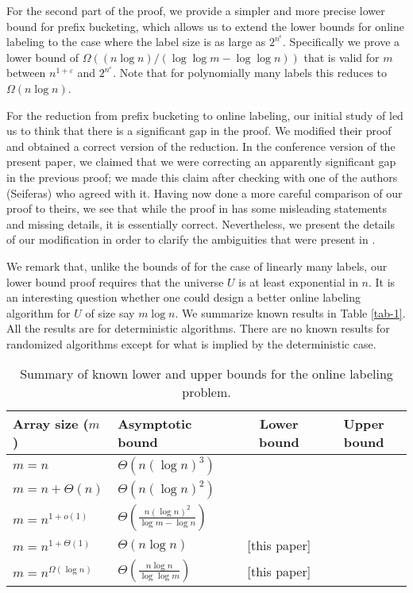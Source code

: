 \documentclass[11pt]{article}
\newcommand{\PTheta}[1]{\Theta\!\left(#1\right)}
\begin{document}
For the second part of the proof,
we provide a simpler and more precise lower bound for prefix bucketing,
which allows us to extend the lower bounds for online labeling to the case where the label size is as large as $2^{n^\epsilon}$.
Specifically we prove a lower bound of
$\Omega((n \log n) / (\log \log m - \log \log n))$ that is valid
for $m$ between $n^{1+\varepsilon}$ and $2^{n^{\varepsilon}}$.
Note that for polynomially many labels this reduces to $\Omega(n \log n)$.

For the reduction from prefix bucketing to online labeling,
our initial study of \cite{DSZ04} led us to think that there is a significant gap in the proof.
We modified their proof and obtained a correct version of the reduction.
In the conference version of the present paper,
we claimed that we were correcting an apparently significant gap in the previous proof;
we made this claim after checking with one of the authors (Seiferas) who agreed with it.
Having now done a more careful comparison of our proof to theirs,
we see that while the proof in \cite{DSZ04} has some misleading statements and missing details,
it is essentially correct.
Nevertheless, we present the details of our modification in order to clarify the ambiguities that were present in \cite{DSZ04}.


We remark that, unlike the bounds of \cite{BKS} for the case of linearly many labels, our lower bound proof requires that the universe
$U$ is at least exponential in $n$. It is an interesting question whether one could design
a better online labeling algorithm for $U$ of size say $m \log n$. We summarize known results in Table \ref{tab-1}. All the results
are for deterministic algorithms. There are no known results for randomized algorithms except for what is implied by the deterministic case.

\begin{table}
\centering
\caption{Summary of known lower and upper bounds for the online labeling problem.} \label{tab-1}
\begin{tabular}{l l c c}
	\toprule
	Array size ($m$) &
	Asymptotic bound &
	Lower bound &
	Upper bound
	\\ \toprule

	$m = n$ &
	$\PTheta{n (\log n)^3}$ &
	\cite{BKS} &
	\cite{Zhang}
	\\ \midrule

	$m = n + \PTheta{n}$ &
	$\PTheta{n (\log n)^2}$ &
	\cite{BKS} &
	\cite{Itaietal}
	\\ \midrule
	
	$m = n ^ {1 + o(1)}$ &
	$\PTheta{\frac{n (\log n)^2}{\log m - \log n}}$ &
	\cite{manuscript} &
	\cite{Itaietal}
	\\ \midrule
	
	$m = n ^ {1 + \Theta(1)}$ &
	$\PTheta{n \log n}$ &
	[this paper] &
	\cite{Itaietal}
	\\ \midrule
	
	$m = n ^ {\Omega(\log n)}$ &
	$\PTheta{\frac{n \log n}{\log \log m}}$ &
	[this paper] &
	\cite{BKS}
	\\ \bottomrule
\end{tabular}
\label{table:table_bounds}
\end{table}
\end{document}
